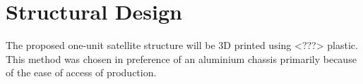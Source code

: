 \section{Structural Design}
The proposed one-unit satellite structure will be 3D printed using <???> plastic. This method was chosen in preference of an aluminium chassis primarily because of the ease of access of production. 